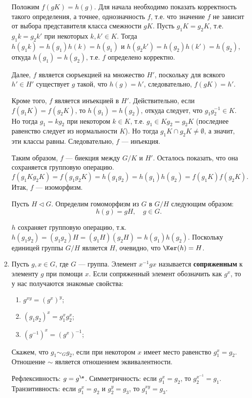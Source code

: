 \begin{enumerate}
{Положим $f(gK)=h(g)$. Для начала необходимо показать корректность такого определения, а точнее, однозначность $f$, т.е. что значение $f$ не зависит от выбора представителя класса смежности $gK$.
Пусть $g_1K=g_2K$, т.е. $g_1k=g_2k'$ при некоторых $k,k'\in K$. Тогда $h(g_1k)=h(g_1)h(k)=h(g_1)$ и $h(g_2k')=h(g_2)h(k')=h(g_2)$, откуда $h(g_1)=h(g_2)$, т.е. $f$ определено корректно.

Далее, $f$ является сюръекцией на множество $H'$, поскольку для всякого $h'\in H'$ существует $g$ такой, что $h(g)=h'$, следовательно, $f(gK)=h'$.

Кроме того, $f$ является инъекцией в $H'$. Действительно, если $f(g_1K)=f(g_2K)$, то $h(g_1)=h(g_2)$, откуда следует, что $g_1g_2^{-1}\in K$. Но тогда $g_1=kg_2$ при некотором $k\in K$, т.е. $g_1\in Kg_2=g_2K$ (последнее равенство следует из нормальности $K$). Но тогда $g_1K\cap g_2K\ne\emptyset$, а значит, эти классы равны. Следовательно, $f$ --- инъекция.

Таким образом, $f$ --- биекция между $G/K$ и $H'$. Осталось показать, что она сохраняется групповую операцию.
$$
f(g_1Kg_2K)=f(g_1g_2K)=h(g_1g_2)=h(g_1)h(g_2)=f(g_1K)f(g_2K).
$$
Итак, $f$ --- изоморфизм.

Пусть $H\vartriangleleft G$. Определим гомоморфизм из $G$ в $G/H$ следующим образом:
$$
h(g)=gH, \quad g\in G.
$$

$h$ сохраняет групповую операцию, т.к. $h(g_1g_2)=(g_1g_2)H=(g_1H)(g_2H)=h(g_1)h(g_2)$. Поскольку единицей группы $G/H$ является $H$, очевидно, что $\Ker(h)=H$.
\epf}




\item Пусть $g,x\in G$, где $G$ --- группа. Элемент $x^{-1}gx$ называется \textbf{сопряженным} к элементу $g$ при помощи $x$. Если сопряженный элемент обозначить как $g^x$, то у нас получаются знакомые свойства:
\begin{enumerate}[1)]
\item $g^{xy}=(g^x)^y$;
\item $(g_1g_2)^x=g_1^xg_2^x$;
\item $(g^{-1})^x=(g^x)^{-1}$;
\end{enumerate}

\begin{lem} Скажем, что $g_1\sim_G g_2$, если при некотором $x$ имеет место равенство $g_1^x=g_2$. Отношение $\sim$ является отношением эквивалентности.
\end{lem}
\pf Рефлексивность: $g=g^\e$. Симметричность: если $g_1^x=g_2$, то $g_2^{x^{-1}}=g_1$. Транзитивность: если $g_1^x=g_2$ и $g_2^y=g_3$, то $g_1^{xy}=g_3$.
\epf


\end{enumerate}
